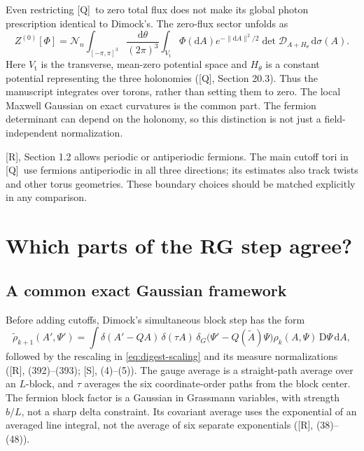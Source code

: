 \documentclass[11pt]{article}
\numberwithin{equation}{section}
\newcommand{\dd}{\mathrm d}
\newcommand{\Q}{\textup{[Q]}}
\newcommand{\UR}{\textup{[R]}}
\newcommand{\US}{\textup{[S]}}
\begin{document}
Even restricting \Q\ to zero total flux does not make its global
photon prescription identical to Dimock's. The zero-flux sector
unfolds as
\begin{equation}
 Z^{(0)}[\Phi]
 =\mathcal N_n\int_{[-\pi,\pi]^3}\frac{\dd\theta}{(2\pi)^3}
  \int_{V_{\mathrm t}}\Phi(\dd A)e^{-\|\dd A\|^2/2}
        \det\mathcal D_{A+H_\theta}\,\dd\sigma(A).
 \label{eq:digest-unfold}
\end{equation}
Here $V_{\mathrm t}$ is the transverse, mean-zero potential space and
$H_\theta$ is a constant potential representing the three holonomies
(\Q, Section 20.3). Thus the manuscript integrates over torons, rather
than setting them to zero. The local Maxwell Gaussian on exact
curvatures is the common part. The fermion determinant can depend on
the holonomy, so this distinction is not just a field-independent
normalization.

\UR, Section 1.2 allows periodic or antiperiodic fermions. The main
cutoff tori in \Q\ use fermions antiperiodic in all three directions;
its estimates also track twists and other torus geometries. These
boundary choices should be matched explicitly in any comparison.

\section{Which parts of the RG step agree?}

\subsection{A common exact Gaussian framework}

Before adding cutoffs, Dimock's simultaneous block step has the form
\begin{equation}
 \widetilde\rho_{k+1}(A',\Psi')
 =\int\delta(A'-QA)\,\delta(\tau A)\,
       \delta_G\bigl(\Psi'-Q(\widetilde A)\Psi\bigr)
       \rho_k(A,\Psi)\,\mathrm D\Psi\,\dd A,
 \label{eq:digest-RG}
\end{equation}
followed by the rescaling in \eqref{eq:digest-scaling} and its measure
normalizations (\UR, (392)--(393); \US, (4)--(5)). The gauge average
is a straight-path average over an $L$-block, and $\tau$ averages the
six coordinate-order paths from the block center. The fermion block
factor is a Gaussian in Grassmann variables, with strength $b/L$,
not a sharp delta constraint. Its covariant average uses the
exponential of an averaged line integral, not the average of six
separate exponentials (\UR, (38)--(48)).
\end{document}
